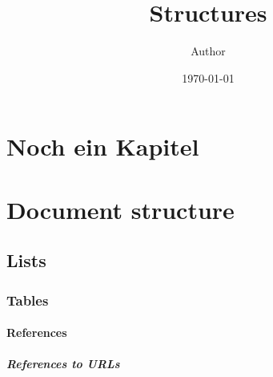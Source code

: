 \documentclass[12pt,oneside]{report}
\title{Structures}
\author{Author}
\date{\today}
\begin{document}
\maketitle
\tableofcontents
\chapter{Noch ein Kapitel}
\blindtext[5]
\chapter{Document structure}
\blindtext
\section{Lists}
\subsection{Tables}
\blindtext
\subsubsection{References}
\blindtext 
\paragraph{References to URLs}
\blindtext
\end{document}
